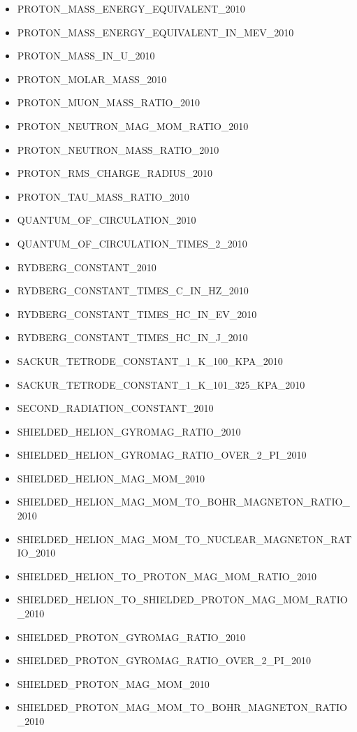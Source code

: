 \begin{itemize}
  PROTON\_MASS\_2010
\item
  PROTON\_MASS\_ENERGY\_EQUIVALENT\_2010
\item
  PROTON\_MASS\_ENERGY\_EQUIVALENT\_IN\_MEV\_2010
\item
  PROTON\_MASS\_IN\_U\_2010
\item
  PROTON\_MOLAR\_MASS\_2010
\item
  PROTON\_MUON\_MASS\_RATIO\_2010
\item
  PROTON\_NEUTRON\_MAG\_MOM\_RATIO\_2010
\item
  PROTON\_NEUTRON\_MASS\_RATIO\_2010
\item
  PROTON\_RMS\_CHARGE\_RADIUS\_2010
\item
  PROTON\_TAU\_MASS\_RATIO\_2010
\item
  QUANTUM\_OF\_CIRCULATION\_2010
\item
  QUANTUM\_OF\_CIRCULATION\_TIMES\_2\_2010
\item
  RYDBERG\_CONSTANT\_2010
\item
  RYDBERG\_CONSTANT\_TIMES\_C\_IN\_HZ\_2010
\item
  RYDBERG\_CONSTANT\_TIMES\_HC\_IN\_EV\_2010
\item
  RYDBERG\_CONSTANT\_TIMES\_HC\_IN\_J\_2010
\item
  SACKUR\_TETRODE\_CONSTANT\_1\_K\_100\_KPA\_2010
\item
  SACKUR\_TETRODE\_CONSTANT\_1\_K\_101\_325\_KPA\_2010
\item
  SECOND\_RADIATION\_CONSTANT\_2010
\item
  SHIELDED\_HELION\_GYROMAG\_RATIO\_2010
\item
  SHIELDED\_HELION\_GYROMAG\_RATIO\_OVER\_2\_PI\_2010
\item
  SHIELDED\_HELION\_MAG\_MOM\_2010
\item
  SHIELDED\_HELION\_MAG\_MOM\_TO\_BOHR\_MAGNETON\_RATIO\_2010
\item
  SHIELDED\_HELION\_MAG\_MOM\_TO\_NUCLEAR\_MAGNETON\_RATIO\_2010
\item
  SHIELDED\_HELION\_TO\_PROTON\_MAG\_MOM\_RATIO\_2010
\item
  SHIELDED\_HELION\_TO\_SHIELDED\_PROTON\_MAG\_MOM\_RATIO\_2010
\item
  SHIELDED\_PROTON\_GYROMAG\_RATIO\_2010
\item
  SHIELDED\_PROTON\_GYROMAG\_RATIO\_OVER\_2\_PI\_2010
\item
  SHIELDED\_PROTON\_MAG\_MOM\_2010
\item
  SHIELDED\_PROTON\_MAG\_MOM\_TO\_BOHR\_MAGNETON\_RATIO\_2010

\end{itemize}
